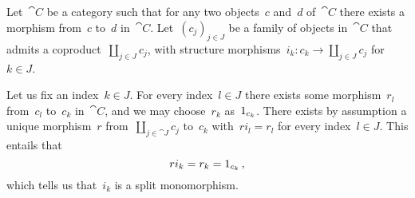 \subsection{}

Let~$\cat{C}$ be a category such that for any two objects~$c$ and~$d$ of~$\cat{C}$ there exists a morphism from~$c$ to~$d$ in~$\cat{C}$.
Let~$(c_j)_{j ∈ J}$ be a family of objects in~$\cat{C}$ that admits a coproduct~$∐_{j ∈ J} c_j$, with structure morphisms~$i_k \colon c_k \to ∐_{j ∈ J} c_j$ for~$k ∈ J$.

Let us fix an index~$k ∈ J$.
For every index~$l ∈ J$ there exists some morphism~$r_l$ from~$c_l$ to~$c_k$ in~$\cat{C}$, and we may choose~$r_k$ as~$1_{c_k}$.
There exists by assumption a unique morphism~$r$ from~$∐_{j ∈ \cat{J}} c_j$ to~$c_k$ with~$r i_l = r_l$ for every index~$l ∈ J$.
This entails that
\[
	r i_k = r_k = 1_{c_k} \,,
\]
which tells us that~$i_k$ is a split monomorphism.
